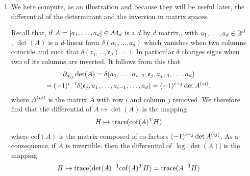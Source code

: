 \begin{enumerate}[label={\bf \arabic*.}]
Differentials obey the product rule and the chain rule. If $f,g: U \to \mR$, then
\[
d(fg)(x) = f(x) dg(x) + g(x) df(x).
\] 
If $f : U \to \mR^m$, $g: \tilde U \subset \mR^k \to U$, then
\[
d(f\circ g)(x) = df(g(x)) dg(x).
\]

If $d=m$ (so that $df(x)$ is a square matrix), we let $\nabla \cdot f (x) = \trace(df(x)) $, the divergence of $f$.


The Euclidean gradient of a differentiable function  $f: U \to \mR$ is $\nabla f(x) = df(x)^T$. More generally, one defines the gradient of $f$ with respect to a tensor field $x\mapsto A(x)$ taking values in $\CS^{++}_d$,  as the vector $\nabla_Af(x)$ that satisfies the relation
\[
df(x) h = \nabla_Af(x)^T A(x) h
\]
for all $h\in \mR^d$, so that 
\begin{equation}
\label{eq:gradient.A}
\nabla_Af(x) = A(x)^{-1} df(x)^T.
\end{equation}
In particular, the Euclidean gradient is associated with $A(x) = \Id[d]$ for all $x$.  With some abuse of notation, we will denote $\nabla_A f = A^{-1} \nabla f$ when $A$ is a fixed matrix, therefore identified with the constant tensor field $x\mapsto A$.

\item We here compute, as an illustration and because they will be useful later, the differential of the determinant and the inversion in matrix spaces.

Recall that, if $A = [a_1, \ldots, a_d]\in {\mathcal M}_d$ is a $d$ by $d$ matrix,, with $a_1, \ldots, a_d\in {\mathbb{R}}^d$, $\det(A)$ is a $d$-linear form 
$\delta(a_1, \ldots, a_d)$
which vanishes when two columns coincide and such that $\delta(\mathfrak e_1, \ldots, \mathfrak e_d) = 1$. In particular $\delta$ changes signs when two of its columns are inverted. It follows from this that
\begin{multline*}
\partial_{a_{ij}} \det(A) = \delta(a_1, \ldots, a_{i-1}, \mathfrak e_j, a_{j+1}, \ldots, a_d) \\
= (-1)^{i-1} \delta(\mathfrak e_j, a_1, \ldots, a_{i-1}, \ldots, a_d) = (-1)^{i+j} \det A^{(ij)},
\end{multline*}
where $A^{(ij)}$ is the matrix $A$ with row $i$ and column $j$ removed. We therefore find that the differential of $A \mapsto \det(A)$ is the mapping
\begin{equation}
\label{eq:det.der}
H \mapsto {\mathrm{trace}}(\mathrm{cof}(A)^T H)
\end{equation}
where $\mathrm{cof}(A)$ is the matrix composed of co-factors $ (-1)^{i+j} \det A^{(ij)}$. As a consequence, if $A$ is invertible, then the differential of $\log |\det(A)|$ is the mapping
\begin{equation}
\label{eq:det.log.der}
H \mapsto {\mathrm{trace}}(\det(A)^{-1}\mathrm{cof}(A)^T H) = {\mathrm{trace}}(A^{-1} H)
\end{equation}



\end{enumerate}
